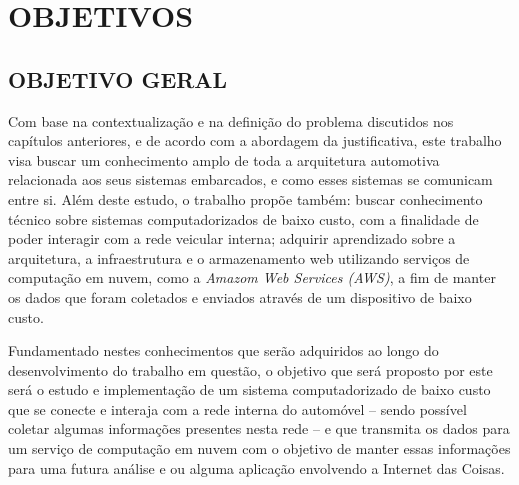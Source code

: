 \chapter{OBJETIVOS}\label{CAP3}

\section{OBJETIVO GERAL}
Com base na contextualização e na definição do problema discutidos nos capítulos anteriores, e de acordo com a abordagem da justificativa, este trabalho visa buscar um conhecimento amplo de toda a arquitetura automotiva relacionada aos seus sistemas embarcados, e como esses sistemas se comunicam entre si. Além deste estudo, o trabalho propõe também: buscar conhecimento técnico sobre sistemas computadorizados de baixo custo, com a finalidade de poder interagir com a rede veicular interna; adquirir aprendizado sobre a arquitetura, a infraestrutura e o armazenamento web utilizando serviços de computação em nuvem, como a \textit{Amazom Web Services (AWS)}, a fim de manter os dados que foram coletados e enviados através de um dispositivo de baixo custo.

Fundamentado nestes conhecimentos que serão adquiridos ao longo do desenvolvimento do trabalho em questão, o objetivo que será proposto por este será o estudo e implementação de um sistema computadorizado de baixo custo que se conecte e interaja com a rede interna do automóvel – sendo possível coletar algumas informações presentes nesta rede – e que transmita os dados para um serviço de computação em nuvem com o objetivo de manter essas informações para uma futura análise e ou alguma aplicação envolvendo a Internet das Coisas.

